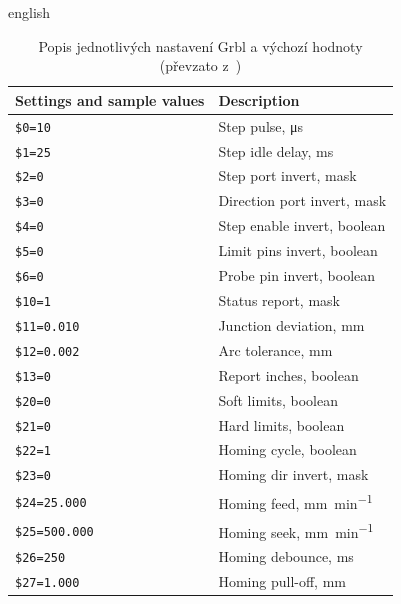 \begin{table}[H]
    \centering
    \caption{%
        Popis jednotlivých nastavení Grbl a výchozí hodnoty (převzato
        z~\cite{Grblconf})
    }
    \label{tab:grbl config default}
    \begin{otherlanguage*}{english}
        \begin{tabular}{ll}
            \toprule
            Settings and sample values  & Description \\
            \midrule
            \verb|$0=10|                & Step pulse, \si{\micro\second} \\
            \verb|$1=25|                & Step idle delay, \si{\milli\second} \\
            \verb|$2=0|                 & Step port invert, mask \\
            \verb|$3=0|                 & Direction port invert, mask \\
            \verb|$4=0|                 & Step enable invert, boolean \\
            \verb|$5=0|                 & Limit pins invert, boolean \\
            \verb|$6=0|                 & Probe pin invert, boolean \\
            \verb|$10=1|                & Status report, mask \\
            \verb|$11=0.010|            & Junction deviation, \si{\milli\meter} \\
            \verb|$12=0.002|            & Arc tolerance, \si{\milli\meter} \\
            \verb|$13=0|                & Report inches, boolean \\
            \verb|$20=0|                & Soft limits, boolean \\
            \verb|$21=0|                & Hard limits, boolean \\
            \verb|$22=1|                & Homing cycle, boolean \\
            \verb|$23=0|                & Homing dir invert, mask \\
            \verb|$24=25.000|           & Homing feed, \si{\milli\meter\per\minute} \\
            \verb|$25=500.000|          & Homing seek, \si{\milli\meter\per\minute} \\
            \verb|$26=250|              & Homing debounce, \si{\milli\second} \\
            \verb|$27=1.000|            & Homing pull-off, \si{\milli\meter} \\

\end{tabular}
\end{otherlanguage*}
\end{table}
